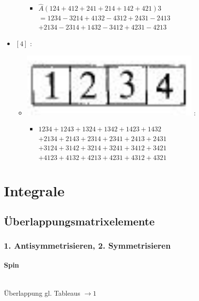 \documentclass[12pt,a4paper]{article}
\newcommand{\h}[2]{\color{#1} #2 \color{black} }
\newcommand{\equalInM}[1]{\h{blue}{#1}} %
\begin{document}
\begin{itemize}
\begin{itemize}
\begin{itemize}
 \item  $ \hat{A} \left( 124 + 412 + 241 + 214 + 142 + 421\right)3 $ \\
 $ =1234 - 3214 + 4132 - 4312 + 2431 - 2413 $ \\
 $ + 2134 - 2314 + 1432 - 3412 + 4231-4213 $
\end{itemize}
\end{itemize}
\item $\left[ 4\right]$ :
\begin{itemize}
\item \includegraphics[scale=0.2]{build/young-4.png} : 
\begin{itemize}[label=$\ast$]
 \item \equalInM{$1234 + 1243 + 1324 + 1342 + 1423 + 1432  $\\
 $ + 2134 + 2143 + 2314 + 2341 + 2413+2431$ \\
 $ + 3124 + 3142 + 3214 + 3241 + 3412 + 3421 $\\
 $ + 4123 + 4132 + 4213 + 4231 + 4312 + 4321 $}
\end{itemize}
\end{itemize}
\end{itemize}


 
 
 \newpage
 \section{Integrale}
 \subsection{Überlappungsmatrixelemente}
 
 \subsubsection{1. Antisymmetrisieren, 2. Symmetrisieren}
 \paragraph{Spin}$ $ \\
  Überlappung gl. Tableaus $\rightarrow 1$ \\
  
\end{document}
